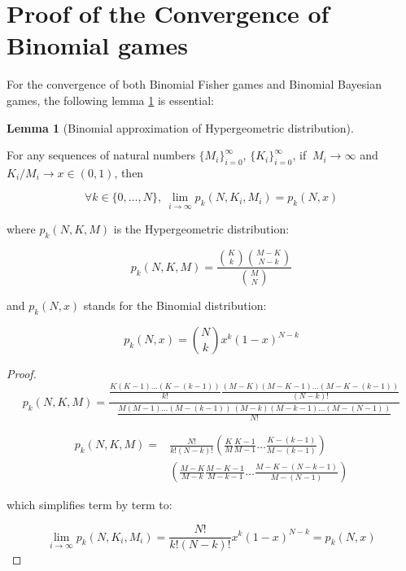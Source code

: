 \documentclass{article}
\theoremstyle{definition}
\newtheorem{lemma}{Lemma}[section]
\begin{document}
\section{Proof of the Convergence of Binomial games}
\label{appendix:BinomialGames}

For the convergence of both Binomial Fisher games and Binomial Bayesian games, the following lemma \ref{lemma:BinomHyperApprox} is essential:

\begin{lemma}[Binomial approximation of Hypergeometric distribution]
\label{lemma:BinomHyperApprox}

For any sequences of natural numbers $\{M_i\}_{i=0}^\infty$, $\{K_i\}_{i=0}^\infty$, if $\ M_i \to \infty$ and $K_i/M_i \to x \in (0,1)$, then

\begin{equation}
    \forall k \in \{0,\dots,N \}, \ \lim_{i \to \infty} p_k(N,K_i,M_i) = p_k(N,x)
\end{equation}

where $p_k(N,K,M)$ is the Hypergeometric distribution:

\begin{equation}
    p_k(N,K,M) = \frac{\binom{K}{k} \binom{M-K}{N-k}}{\binom{M}{N}}
\end{equation}

and $p_k(N,x)$ stands for the Binomial distribution:

\begin{equation}
     p_k(N,x) = \binom{N}{k} x^k (1-x)^{N-k}
\end{equation}

\end{lemma}

\begin{proof}

    \begin{equation}
        p_k(N,K,M) = \frac{
        \frac{K(K-1)\dots(K-(k-1))}{k!}
        \frac{(M-K)(M-K-1)\dots(M-K-(k-1))}{(N-k)!}
        }
        {
        \frac{M(M-1)\dots(M-(k-1)) \ (M-k)(M-k-1)\dots(M-(N-1))}{N!}
        }
    \end{equation}

    \begin{equation}
    \begin{split}
        p_k(N,K,M) =& \frac{N!}{k!(N-k)!}
        \left ( \frac{K}{M} \frac{K-1}{M-1} \dots \frac{K-(k-1)}{M-(k-1)} \right ) \\
        & \left ( \frac{M-K}{M-k} \frac{M-K-1}{M-k-1} \dots \frac{M-K-(N-k-1)}{M-(N-1)} \right )
    \end{split}
    \end{equation}

    which simplifies term by term to:

    \begin{equation}
        \lim_{i \to \infty} p_k(N,K_i,M_i) = \frac{N!}{k!(N-k)!} x^k (1-x)^{N-k} 
        = p_k(N,x)
    \end{equation}

    
\end{proof}
\end{document}
